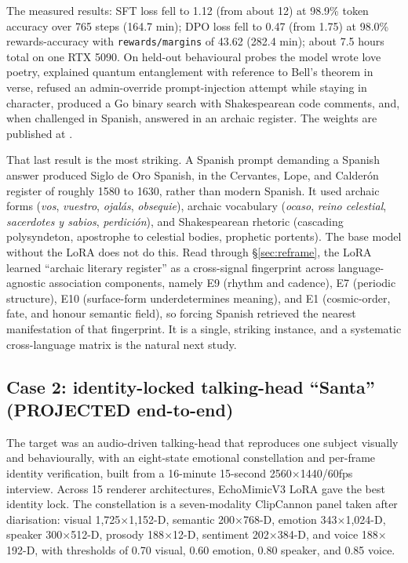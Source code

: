 \documentclass[10pt,twocolumn]{article}
\begin{document}
The measured results: SFT loss fell to 1.12 (from about 12) at 98.9\% token
accuracy over 765 steps (164.7 min); DPO loss fell to 0.47 (from 1.75) at 98.0\%
rewards-accuracy with \texttt{rewards/margins} of 43.62 (282.4 min); about 7.5
hours total on one RTX 5090. On held-out behavioural probes the model wrote love
poetry, explained quantum entanglement with reference to Bell's theorem in verse,
refused an admin-override prompt-injection attempt while staying in character,
produced a Go binary search with Shakespearean code comments, and, when challenged
in Spanish, answered in an archaic register. The weights are published at
.

That last result is the most striking. A Spanish prompt demanding a Spanish answer
produced Siglo de Oro Spanish, in the Cervantes, Lope, and Calder\'on register of
roughly 1580 to 1630, rather than modern Spanish. It used archaic forms
(\emph{vos}, \emph{vuestro}, \emph{ojal\'as}, \emph{obsequie}), archaic vocabulary
(\emph{ocaso}, \emph{reino celestial}, \emph{sacerdotes y sabios},
\emph{perdici\'on}), and Shakespearean rhetoric (cascading polysyndeton,
apostrophe to celestial bodies, prophetic portents). The base model without the
LoRA does not do this. Read through \S\ref{sec:reframe}, the LoRA learned ``archaic
literary register'' as a cross-signal fingerprint across language-agnostic
association components, namely E9 (rhythm and cadence), E7 (periodic structure),
E10 (surface-form underdetermines meaning), and E1 (cosmic-order, fate, and honour
semantic field), so forcing Spanish retrieved the nearest manifestation of that
fingerprint. It is a single, striking instance, and a systematic cross-language
matrix is the natural next study.

\subsection{Case 2: identity-locked talking-head ``Santa'' (PROJECTED end-to-end)}
The target was an audio-driven talking-head that reproduces one subject visually
and behaviourally, with an eight-state emotional constellation and per-frame
identity verification, built from a 16-minute 15-second 2560$\times$1440/60fps
interview. Across 15 renderer architectures, EchoMimicV3 LoRA gave the best
identity lock. The constellation is a seven-modality ClipCannon panel taken after
diarisation: visual 1{,}725$\times$1{,}152-D, semantic 200$\times$768-D, emotion
343$\times$1{,}024-D, speaker 300$\times$512-D, prosody 188$\times$12-D, sentiment
202$\times$384-D, and voice 188$\times$192-D, with thresholds of 0.70 visual, 0.60
emotion, 0.80 speaker, and 0.85 voice.
\end{document}

